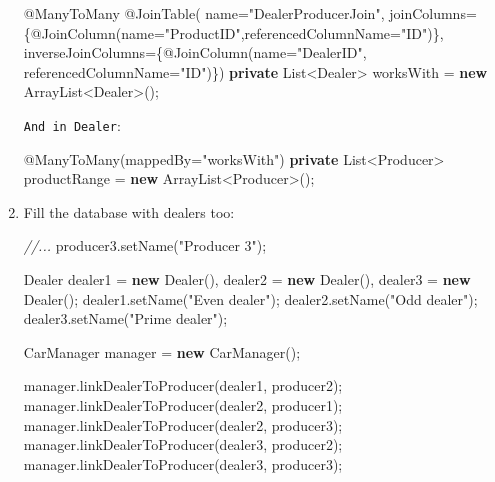 \documentclass[]{report}
\newenvironment{Shaded}{}{}
\newcommand{\KeywordTok}[1]{\textcolor[rgb]{0.00,0.44,0.13}{\textbf{{#1}}}}
\newcommand{\StringTok}[1]{\textcolor[rgb]{0.25,0.44,0.63}{{#1}}}
\newcommand{\CommentTok}[1]{\textcolor[rgb]{0.38,0.63,0.69}{\textit{{#1}}}}
\newcommand{\FunctionTok}[1]{\textcolor[rgb]{0.02,0.16,0.49}{{#1}}}
\newcommand{\NormalTok}[1]{{#1}}
\begin{document}
\begin{enumerate}
\begin{Shaded}
\begin{Highlighting}[]
\FunctionTok{@ManyToMany}
\FunctionTok{@JoinTable}\NormalTok{(}
    \NormalTok{name=}\StringTok{"DealerProducerJoin"}\NormalTok{,}
    \NormalTok{joinColumns=\{}\FunctionTok{@JoinColumn}\NormalTok{(name=}\StringTok{"ProductID"}\NormalTok{,referencedColumnName=}\StringTok{"ID"}\NormalTok{)\},}
    \NormalTok{inverseJoinColumns=\{}\FunctionTok{@JoinColumn}\NormalTok{(name=}\StringTok{"DealerID"}\NormalTok{, referencedColumnName=}\StringTok{"ID"}\NormalTok{)\})}
\KeywordTok{private} \NormalTok{List<Dealer> worksWith = }\KeywordTok{new} \NormalTok{ArrayList<Dealer>();}
\end{Highlighting}
\end{Shaded}

  \texttt{And in Dealer}:

\begin{Shaded}
\begin{Highlighting}[]
\FunctionTok{@ManyToMany}\NormalTok{(mappedBy=}\StringTok{"worksWith"}\NormalTok{)}
\KeywordTok{private} \NormalTok{List<Producer> productRange = }\KeywordTok{new} \NormalTok{ArrayList<Producer>();}
\end{Highlighting}
\end{Shaded}
\item
  Fill the database with dealers too:

\begin{Shaded}
\begin{Highlighting}[]
\CommentTok{//...}
\NormalTok{producer3.}\FunctionTok{setName}\NormalTok{(}\StringTok{"Producer 3"}\NormalTok{);}

\NormalTok{Dealer}
    \NormalTok{dealer1 = }\KeywordTok{new} \FunctionTok{Dealer}\NormalTok{(),}
    \NormalTok{dealer2 = }\KeywordTok{new} \FunctionTok{Dealer}\NormalTok{(),}
    \NormalTok{dealer3 = }\KeywordTok{new} \FunctionTok{Dealer}\NormalTok{();}
\NormalTok{dealer1.}\FunctionTok{setName}\NormalTok{(}\StringTok{"Even dealer"}\NormalTok{);}
\NormalTok{dealer2.}\FunctionTok{setName}\NormalTok{(}\StringTok{"Odd dealer"}\NormalTok{);}
\NormalTok{dealer3.}\FunctionTok{setName}\NormalTok{(}\StringTok{"Prime dealer"}\NormalTok{);}

\NormalTok{CarManager manager = }\KeywordTok{new} \FunctionTok{CarManager}\NormalTok{();}

\NormalTok{manager.}\FunctionTok{linkDealerToProducer}\NormalTok{(dealer1, producer2);}
\NormalTok{manager.}\FunctionTok{linkDealerToProducer}\NormalTok{(dealer2, producer1);}
\NormalTok{manager.}\FunctionTok{linkDealerToProducer}\NormalTok{(dealer2, producer3);}
\NormalTok{manager.}\FunctionTok{linkDealerToProducer}\NormalTok{(dealer3, producer2);}
\NormalTok{manager.}\FunctionTok{linkDealerToProducer}\NormalTok{(dealer3, producer3);}


\end{Highlighting}
\end{Shaded}
\end{enumerate}
\end{document}
